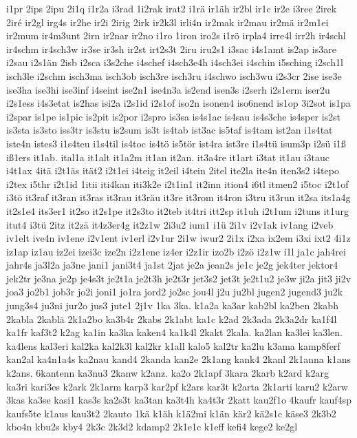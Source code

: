 {i1pr
2ips
2ipu
2i1q
i1r2a
i3rad
1i2rak
irat2
i1rä
ir1äh
ir2bl
ir1c
ir2e
i3ree
2irek
2iré
ir2gl
irg4s
ir2he
ir2i
2irig
2irk
ir2k3l
irli4n
ir2mak
ir2mau
ir2mä
ir2m1ei
ir2mum
ir4m3unt
2irn
ir2nar
ir2no
i1ro
1iron
iro2s
i1rö
irpla4
irre4l
irr2h
ir4schl
ir4schm
ir4sch3w
ir3se
ir3sh
ir2st
irt2s3t
2iru
iru2s1
i3sac
i4s1amt
is2ap
is3are
i2sau
i2s1än
2isb
i2sca
i3s2che
i4schef
i4sch3e4h
i4sch3ei
i4schin
i5sching
i2sch1l
isch3le
i2schm
isch3ma
isch3ob
isch3re
isch3ru
i4schwo
isch3wu
i2s3cr
2ise
ise3e
ise3ha
ise3hi
ise3inf
i4seint
ise2n1
ise4n3a
is2end
isen3s
i2serh
i2s1erm
iser2u
i2s1ess
i4s3etat
is2has
isi2a
i2s1id
i2s1of
iso2n
isonen4
iso6nend
is1op
3i2sot
is1pa
i2spar
is1pe
is1pic
is2pit
is2por
i2spro
is3sa
is4s1ac
is4sau
is4s3che
is4sper
is2st
is3sta
is3sto
iss3tr
is3stu
is2sum
is3t
is4tab
ist3ac
is5taf
is4tam
ist2an
i1s4tat
iste4n
istes3
i1s4teu
i1s4til
is4toc
is4tö
is5tör
ist4ra
ist3re
i1s4tü
isum3p
i2sü
i1ß
iß1ers
it1ab.
ital1a
it1alt
it1a2m
it1an
it2an.
it3a4re
it1art
i3tat
it1au
i3tauc
i4t1ax
4itä
i2t1äs
ität2
i2t1ei
i4teig
it2eil
i4tein
2itel
ite2la
ite4n
iten3s2
i4tepo
i2tex
i5thr
i2t1id
1itii
iti4kan
iti3k2e
i2t1in1
it2inn
ition4
i6tl
itmen2
i5toc
i2t1of
i3tö
it3raf
it3ran
it3ras
it3rau
it3räu
it3re
it3rom
it4ron
i3tru
it3run
it2sa
its1a4g
it2s1e4
its3er1
it2so
it2s1pe
it2s3to
it2teb
it4tri
itt2sp
it1uh
i2t1um
i2tuns
it1urg
itut4
i3tü
2itz
it2zä
it4z3er4g
it2z1w
2i3u2
ium1
i1ü
2i1v
i2v1ak
iv1ang
i2veb
iv1elt
ive4n
iv1ene
i2v1ent
iv1erl
i2v1ur
2i1w
iwur2
2i1x
i2xa
ix2em
i3xi
ixt2
4i1z
iz1ap
iz1au
iz2ei
izei3c
ize2n
i2z1ene
iz4er
i2z1ir
izo2b
i2zö
i2z1w
í1l
ja1c
jah4rei
jahr4s
ja3l2a
ja3ne
jani1
jani3t4
ja1st
2jat
je2a
jean2s
je1c
je2g
jek4ter
jektor4
jek2tr
je3na
je2p
je4s3t
je2t1a
je2t3h
je2t3r
jet3s2
jet3t
je2t1u2
je3w
ji2a
jit3
ji2v
joa3
jo2b1
job3r
jo2i
joni1
jo1ra
jord2
jo2sc
jou4l
j2u
ju2bl
jugen2
jugend3
ju2k
jung3s4
ju3ni
jur2o
jus3
jute1
2j1v
1ka
3ka.
k1a2a
ka3ar
kab2bl
ka2ben
2kabh
2kabla
2kablä
2k1a2bo
ka3b4r
2kabs
2k1abt
ka1c
k2ad
2k3ada
2k3a2dr
ka1f4l
ka1fr
kaf3t2
k2ag
ka1in
ka3ka
kaken4
ka1k4l
2kakt
2kala.
ka2lan
ka3lei
ka3len.
ka4lens
kal3eri
kal2ka
kal2k3l
kal2kr
k1all
kalo5
kal2tr
ka2lu
k3ama
kamp8ferf
kan2al
ka4n1a4s
ka2nau
kand4
2kanda
kan2e
2k1ang
kank4
2kanl
2k1anna
k1ans
k2ans.
6kantenn
ka3nu3
2kanw
k2anz.
ka2o
2k1apf
3kara
2karb
k2ard
k2arg
ka3ri
kari3es
k2ark
2k1arm
karp3
kar2pf
k2ars
kar3t
k2arta
2k1arti
karu2
k2arw
3kas
ka3se
kasi1
kas3s
ka2s3t
ka3tan
ka3t4h
ka4t3r
2katt
kau2f1o
4kaufr
kauf4sp
kaufs5te
k1aus
kau3t2
2kauto
1kä
k1äh
k1ä2mi
k1än
kär2
kä2s1c
käse3
2k3b2
kbo4n
kbu2s
kby4
2k3c
2k3d2
kdamp2
2k1e1c
k1eff
kefi4
kege2
ke2gl
}
